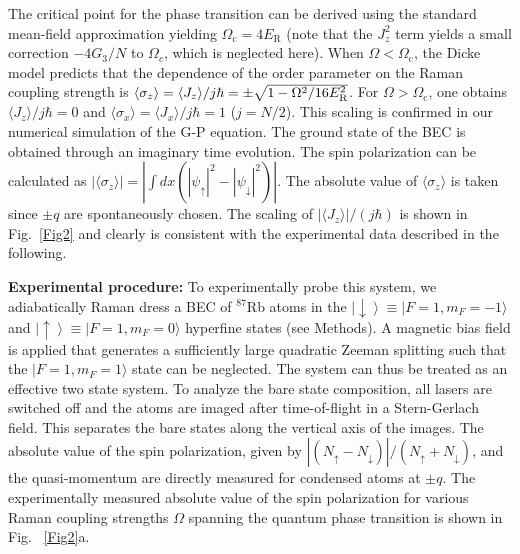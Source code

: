 \documentclass[prl,aps,twocolumn,floatfix]{revtex4}
\begin{document}
The critical point for the phase transition can be derived using the
standard mean-field approximation \cite{Emary,Emary2,Bakemeier} yielding $%
\Omega _{\text{c}}=4E_{\text{R}}$ (note that the $J_{z}^{2}$ term yields a
small correction $-4G_{3}/N$ to $\Omega _{c}$, which is neglected here).
When $\Omega <\Omega _{\text{c}}$, the Dicke model predicts that the
dependence of the order parameter on the Raman coupling strength is $\langle
\sigma_{z}\rangle = \langle J_{z}\rangle /j\hbar =\pm \sqrt{1-\Omega ^{2}/{%
16E_{\text{R}}^{2}}}$. For $\Omega >\Omega _{\text{c}}$, one obtains $%
\langle J_{z}\rangle /j\hbar =0$ and $\langle \sigma _{x}\rangle =\langle
J_{x}\rangle /j\hbar =1 $ ($j=N/2$). This scaling is confirmed in our
numerical simulation of the G-P equation. The ground state of the BEC is
obtained through an imaginary time evolution. The spin polarization can be
calculated as $|\langle \sigma _{z}\rangle |=\left\vert \int dx\left(
\left\vert \psi _{\uparrow }\right\vert ^{2}-\left\vert \psi _{\downarrow
}\right\vert ^{2}\right) \right\vert $. The absolute value of $\langle
\sigma _{z}\rangle $ is taken since $\pm q$ are spontaneously chosen. The
scaling of $|\langle J_{z}\rangle |/(j\hbar )$ is shown in Fig.~\ref{Fig2}
and clearly is consistent with the experimental data described in the
following.

\textbf{Experimental procedure:} To experimentally probe this system, we
adiabatically Raman dress a BEC of $^{87}$Rb atoms in the $\left\vert
\downarrow \right\rangle \equiv |F=1,m_{F}=-1\rangle $ and $\left\vert
\uparrow \right\rangle \equiv |F=1,m_{F}=0\rangle $ hyperfine states (see
Methods). A magnetic bias field is applied that generates a sufficiently
large quadratic Zeeman splitting such that the $|F=1,m_{F}=1\rangle $ state
can be neglected. The system can thus be treated as an effective two state
system. To analyze the bare state composition, all lasers are switched off
and the atoms are imaged after time-of-flight in a Stern-Gerlach field. This
separates the bare states along the vertical axis of the images. The
absolute value of the spin polarization, given by $|(N_{\uparrow
}-N_{\downarrow })|/(N_{\uparrow }+N_{\downarrow })$, and the quasi-momentum
are directly measured for condensed atoms at $\pm q$. The experimentally
measured absolute value of the spin polarization for various Raman coupling
strengths $\Omega $ spanning the quantum phase transition is shown in Fig.~%
\ref{Fig2}a.
\end{document}
